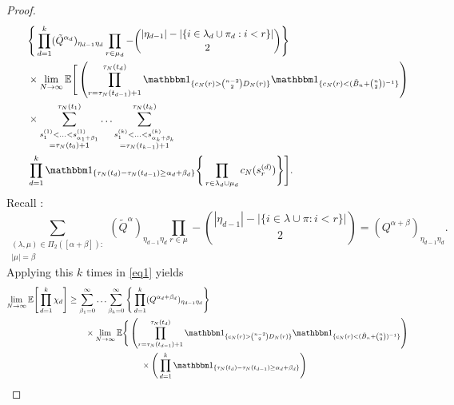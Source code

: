 \begin{proof}
\begin{align}
    &\qquad \Bigg\{ \prod_{ d = 1 }^k 
        ( \tilde{ Q }^{ \alpha_d } )_{ \eta_{ d - 1 } \eta_d }
        \prod_{ r \in \mu_d } - 
        \binom{ | \eta_{ d - 1 } | - | \{ i \in \lambda_d \cup \pi_d : i < r \} | }{ 2 } 
        \Bigg\} \notag \\
    &\qquad \times \lim_{ N \rightarrow \infty } \E\Bigg[ 
        \left( \prod_{r=\tau_N(t_{d-1})+1}^{\tau_N(t_d)}
        \I{ c_N(r) > \binom{n-2}{2} D_N(r) } 
        \I{ c_N(r) < (\tilde{B}_n + \binom{n}{2})^{-1} } \right) \notag\\
    &\qquad\times 
        \sum_{\substack{ s_1^{ ( 1 ) } < \ldots < s_{ \alpha_1 + \beta_1 }^{ ( 1 ) } 
        \\= \tau_N( t_0 ) + 1 }}^{ \tau_N( t_1 ) } \ldots 
        \sum_{\substack{ s_1^{ ( k ) } < \ldots < s_{ \alpha_k + \beta_k }^{ ( k ) } 
        \\= \tau_N( t_{ k - 1 } ) + 1 }}^{ \tau_N( t_k ) } \notag \\
    &\qquad \prod_{ d = 1 }^k 
        \I{ \tau_N( t_d ) - \tau_N( t_{ d - 1 } ) \geq \alpha_d + \beta_d } 
        \Bigg\{ \prod_{ r \in \lambda_d \cup \mu_d } c_N( s_r^{ ( d ) } ) \Bigg\} 
        \Bigg]. \label{eq1}
\end{align}
Recall \parencite[Eq (11)]{koskela2018}:
\begin{equation*}
\sum_{\substack{ ( \lambda, \mu ) \in \Pi_2( [ \alpha + \beta ] ) :
        \\ | \mu | = \beta }} ( \tilde{ Q }^{ \alpha } )_{ \eta_{ d - 1 } \eta_d } 
        \prod_{ r \in \mu } - 
        \binom{ | \eta_{ d - 1 } | - | \{ i \in \lambda \cup \pi : i < r \} | }{ 2 } 
= ( Q^{ \alpha + \beta } )_{ \eta_{ d - 1 } \eta_d } .
\end{equation*}
Applying this $k$ times in \eqref{eq1} yields
\begin{align*}
\lim_{ N \rightarrow \infty } \E\Bigg[ \prod_{ d = 1 }^k \chi_d \Bigg] 
&\geq \sum_{ \beta_1 = 0 }^{ \infty } \ldots \sum_{ \beta_k = 0 }^{ \infty } 
        \Bigg\{ \prod_{ d = 1 }^k 
        ( Q^{ \alpha_d + \beta_d } )_{ \eta_{ d - 1 } \eta_d } \Bigg\} \\
    &\qquad \times \lim_{ N \rightarrow \infty } \E\Bigg\{ 
        \left( \prod_{r=\tau_N(t_{d-1})+1}^{\tau_N(t_d)}
        \I{ c_N(r) > \binom{n-2}{2} D_N(r) } 
        \I{ c_N(r) < (\tilde{B}_n + \binom{n}{2})^{-1} } \right) \\
    &\hspace{3cm}\times \Bigg( \prod_{ d = 1 }^k 
        \I{ \tau_N( t_d ) - \tau_N( t_{ d - 1 } ) \geq \alpha_d + \beta_d } \Bigg) \\

\end{align*}
\end{proof}
